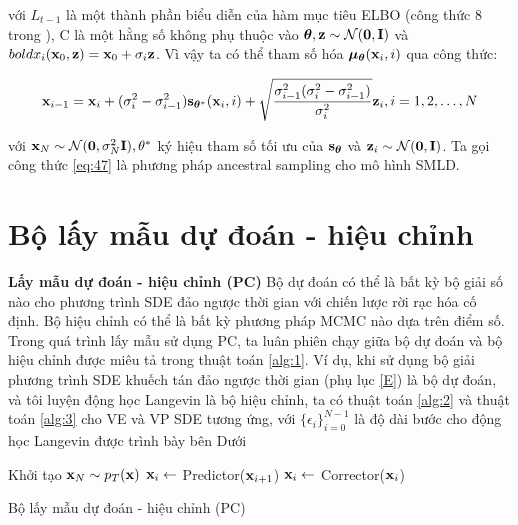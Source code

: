 \documentclass{article} %
\begin{document}
với $L_{t-1}$ là một thành phần biểu diễn của hàm mục tiêu ELBO (công thức 8 trong \citep{ho2020denoising}), C là một hằng số không phụ thuộc vào $\boldsymbol{\theta}, \bold{z} \sim \mathcal{N}(\bold{0}, \bold{I})$ và $bold{x}_i (\bold{x}_0, \bold{z})=\bold{x}_0 + \sigma_i \bold{z}$.
Vì vậy ta có thể tham số hóa $\boldsymbol{\mu}_{\boldsymbol{\theta}}(\bold{x}_i, i)$ qua công thức:

\begin{equation} \label{eq:47}
    \bold{x}_{i-1} = \bold{x}_i + (\sigma_i^2 - \sigma_{i-1}^2) \bold{s}_{\boldsymbol{\theta}^{\ast}} (\bold{x}_i, i) + \sqrt{\dfrac{\sigma_{i-1}^2 (\sigma_i^2 - \sigma_{i-1}^2)}{\sigma_i^2}} \bold{z}_i, i = 1, 2, \dots, N
\end{equation}

với $\bold{x}_N \sim \mathcal{N}(\bold{0}, \sigma_N^2 \bold{I}), \bold{\theta}^{\ast}$ ký hiệu tham số tối ưu của $\bold{s}_{\boldsymbol{\theta}}$ và $\bold{z}_i \sim \mathcal{N}(\bold{0}, \bold{I})$.
Ta gọi công thức \ref{eq:47} là phương pháp ancestral sampling cho mô hình SMLD.

\section{Bộ lấy mẫu dự đoán - hiệu chỉnh} \label{G}

\textbf{Lấy mẫu dự đoán - hiệu chỉnh (PC)} Bộ dự đoán có thể là bất kỳ bộ giải số nào cho phương trình SDE đảo ngược thời gian với chiến lược rời rạc hóa cố định.
Bộ hiệu chỉnh có thể là bất kỳ phương pháp MCMC nào dựa trên điểm số.
Trong quá trình lấy mẫu sử dụng PC, ta luân phiên chạy giữa bộ dự đoán và bộ hiệu chỉnh được miêu tả trong thuật toán \ref{alg:1}.
Ví dụ, khi sử dụng bộ giải phương trình SDE khuếch tán đảo ngược thời gian (phụ lục \ref{E}) là bộ dự đoán, và tôi luyện động học Langevin \citep{song2019generative} là bộ hiệu chỉnh, ta có thuật toán \ref{alg:2} và thuật toán \ref{alg:3} cho VE và VP SDE tương ứng,
với $\lbrace \epsilon_i \rbrace_{i=0}^{N-1}$ là độ dài bước cho động học Langevin được trình bày bên Dưới

\begin{algorithm}[h!]
    \DontPrintSemicolon
    Khởi tạo $\bold{x}_N \sim p_T(\bold{x})$\;
     {
        $\bold{x}_i \gets$ Predictor($\bold{x}_{i+1}$)\;
         {
            $\bold{x}_i \gets$ Corrector($\bold{x}_i$)\;
        }
    }
    \;
    \caption{Bộ lấy mẫu dự đoán - hiệu chỉnh (PC)}
    \label{alg:1}
\end{algorithm}
\end{document}
